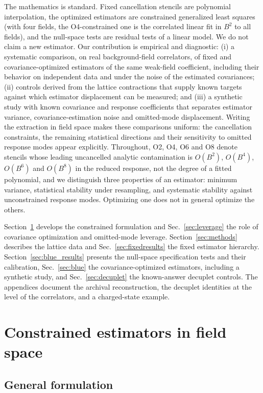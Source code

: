 \documentclass[aps,prd,preprint,nofootinbib,floatfix]{revtex4-2}
\begin{document}
The mathematics is standard. Fixed cancellation stencils are polynomial interpolation, the optimized estimators are constrained generalized least squares (with four fields, the O4-constrained one is the correlated linear fit in $B^2$ to all fields), and the null-space tests are residual tests of a linear model. We do not claim a new estimator. Our contribution is empirical and diagnostic: (i) a systematic comparison, on real background-field correlators, of fixed and covariance-optimized estimators of the same weak-field coefficient, including their behavior on independent data and under the noise of the estimated covariances; (ii) controls derived from the lattice contractions that supply known targets against which estimator displacement can be measured; and (iii) a synthetic study with known covariance and response coefficients that separates estimator variance, covariance-estimation noise and omitted-mode displacement. Writing the extraction in field space makes these comparisons uniform: the cancellation constraints, the remaining statistical directions and their sensitivity to omitted response modes appear explicitly. Throughout, O2, O4, O6 and O8 denote stencils whose leading uncancelled analytic contamination is $O(B^2)$, $O(B^4)$, $O(B^6)$ and $O(B^8)$ in the reduced response, not the degree of a fitted polynomial, and we distinguish three properties of an estimator: minimum variance, statistical stability under resampling, and systematic stability against unconstrained response modes. Optimizing one does not in general optimize the others.

Section~\ref{sec:constrained} develops the constrained formulation and Sec.~\ref{sec:leverage} the role of covariance optimization and omitted-mode leverage. Section~\ref{sec:methods} describes the lattice data and Sec.~\ref{sec:fixedresults} the fixed estimator hierarchy. Section~\ref{sec:blue_results} presents the null-space specification tests and their calibration, Sec.~\ref{sec:blue} the covariance-optimized estimators, including a synthetic study, and Sec.~\ref{sec:decuplet} the known-answer decuplet controls. The appendices document the archival reconstruction, the decuplet identities at the level of the correlators, and a charged-state example.

\section{Constrained estimators in field space}
\label{sec:constrained}

\subsection{General formulation}
\end{document}
